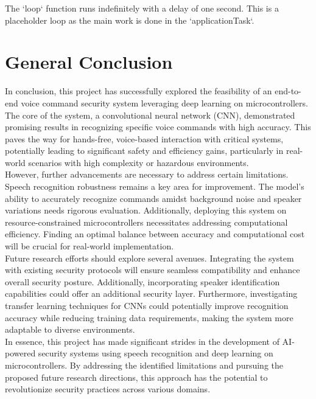 \documentclass[a4paper]{report}
\begin{document}
{The `loop` function runs indefinitely with a delay of one second. This is a placeholder loop as the main work is done in the `applicationTask`.

\chapter*{General Conclusion}
In conclusion, this project has successfully explored the feasibility of an end-to-end voice command security system leveraging deep learning on microcontrollers. The core of the system, a convolutional neural network (CNN), demonstrated promising results in recognizing specific voice commands with high accuracy. This paves the way for hands-free, voice-based interaction with critical systems, potentially leading to significant safety and efficiency gains, particularly in real-world scenarios with high complexity or hazardous environments.
\\
However, further advancements are necessary to address certain limitations. Speech recognition robustness remains a key area for improvement. The model's ability to accurately recognize commands amidst background noise and speaker variations needs rigorous evaluation. Additionally, deploying this system on resource-constrained microcontrollers necessitates addressing computational efficiency. Finding an optimal balance between accuracy and computational cost will be crucial for real-world implementation.
\\
Future research efforts should explore several avenues. Integrating the system with existing security protocols will ensure seamless compatibility and enhance overall security posture. Additionally, incorporating speaker identification capabilities could offer an additional security layer. Furthermore, investigating transfer learning techniques for CNNs could potentially improve recognition accuracy while reducing training data requirements, making the system more adaptable to diverse environments.
\\
In essence, this project has made significant strides in the development of AI-powered security systems using speech recognition and deep learning on microcontrollers. By addressing the identified limitations and pursuing the proposed future research directions, this approach has the potential to revolutionize security practices across various domains.
\begin{thebibliography}{10}
\setcounter{page}{7} 


\end{thebibliography}}
\end{document}
